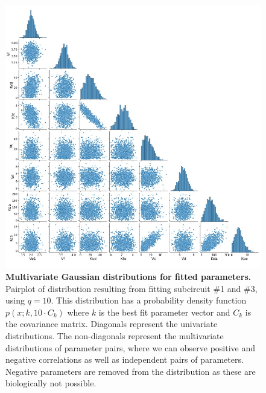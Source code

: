 \begin{figure}[H] %
    \centering
    \begin{adjustbox}{center}
        \includegraphics[width=1\textwidth]{chapters/Chapter 2/multivariate_from_fit} %
    \end{adjustbox}
    \caption{\textbf{Multivariate Gaussian distributions for fitted parameters.}
    Pairplot of distribution resulting from fitting subcircuit \#1 and \#3, using $q=10$.
    This distribution has a probability density function $p(x;k,10\cdot C_{k})$
        where $k$ is the best fit parameter vector and $C_{k}$ is the covariance matrix.
    Diagonals represent the univariate distributions.
    The non-diagonals represent the multivariate distributions of parameter pairs, where we can observe positive and negative correlations as well as independent pairs of parameters. Negative parameters are removed from the distribution as these are biologically not possible.}
    \label{fig:multivariate_from_fit} %
\end{figure}

